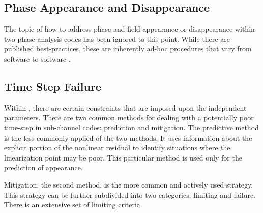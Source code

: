 \subsection{Phase Appearance and Disappearance}
\label{subsect:phase_change}
The topic of how to address phase and field appearance or disappearance within two-phase analysis codes has been ignored to this point.
While there are published best-practices, these are inherently ad-hoc procedures that vary from software to software \cite{Bestion2000}.


\subsection{Time Step Failure}
\label{subsect:time_step_failure}

Within \cobra{}, there are certain constraints that are imposed upon the independent parameters.
There are two common methods for dealing with a potentially poor time-step in sub-channel codes: prediction and mitigation.
The predictive method is the less commonly applied of the two methods.
It uses information about the explicit portion of the nonlinear residual to identify situations where the linearization point may be poor.
This particular method is used only for the prediction of appearance.

Mitigation, the second method, is the more common and actively used strategy.
This strategy can be further subdivided into two categories: limiting and failure.
There is an extensive set of limiting criteria.

